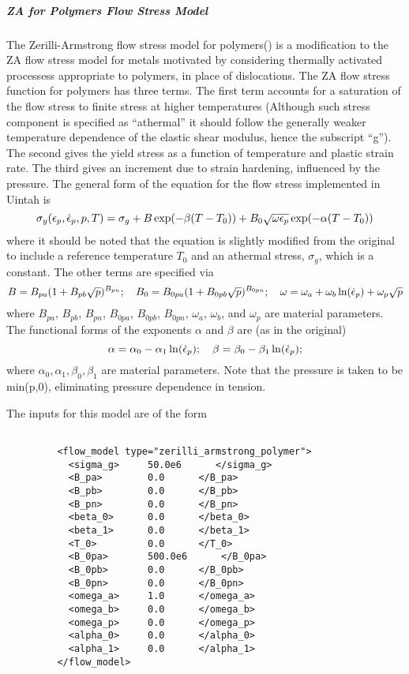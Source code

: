   \subparagraph{ZA for Polymers Flow Stress Model}
  The Zerilli-Armstrong flow stress model for polymers(\cite{Zerilli07})
  is a modification to the ZA flow stress model for metals motivated by considering
  thermally activated processess appropriate to polymers, in place of
  dislocations.  The ZA flow stress function for polymers has three terms.  
  The first term accounts for a saturation of the flow stress to finite stress 
  at higher temperatures (Although such stress component is specified as ``athermal'' 
  it should follow the generally weaker temperature dependence of the elastic 
  shear modulus, hence the subscript ``g''). The second gives the yield stress as 
  a function of temperature and plastic strain rate. The third gives an increment 
  due to strain hardening, influenced by the pressure. The general form of the
  equation for the flow stress implemented in Uintah is
  \begin{equation}
    \sigma_y(\Ep,\Epdot{},p,T) = 
      \sigma_g + B\exp(-\beta(T-T_0)) + 
                           B_0\sqrt{\omega\Ep}\exp(-\alpha(T-T_0))
  \end{equation}
  where it should be noted that the equation is slightly modified from the
  original to include a reference temperature $T_0$ and an athermal stress, 
  $\sigma_g$, which is a constant.  The other terms are specified via
  \begin{equation}
    B=B_{pa}(1+B_{pb}\sqrt{p})^{B_{pn}};\quad
    B_0=B_{0pa}(1+B_{0pb}\sqrt{p})^{B_{0pn}};\quad
    \omega=\omega_a+\omega_b\ln(\Epdot{})+\omega_p \sqrt{p}
  \end{equation}
  where $B_{pa}$, $B_{pb}$, $B_{pn}$, $B_{0pa}$, $B_{0pb}$, $B_{0pn}$, $\omega_a$, $\omega_b$, 
  and $\omega_p$ are material parameters.  The functional forms of the exponents
  $\alpha$ and $\beta$ are (as in the original)
  \begin{equation}
    \alpha = \alpha_0 - \alpha_1 \ln(\Epdot{}); \quad
    \beta = \beta_0 - \beta_1 \ln(\Epdot{}); 
  \end{equation}
  where $\alpha_0, \alpha_1, \beta_0, \beta_1$ are material parameters.  Note that the
  pressure is taken to be min(p,0), eliminating pressure dependence in tension.

  The inputs for this model are of the form
  \begin{Verbatim}[fontsize=\footnotesize]
    
         <flow_model type="zerilli_armstrong_polymer">
           <sigma_g>     50.0e6      </sigma_g>
           <B_pa>        0.0      </B_pa>
           <B_pb>        0.0      </B_pb>
           <B_pn>        0.0      </B_pn>
           <beta_0>      0.0      </beta_0>
           <beta_1>      0.0      </beta_1>
           <T_0>         0.0      </T_0>
           <B_0pa>       500.0e6      </B_0pa>
           <B_0pb>       0.0      </B_0pb>
           <B_0pn>       0.0      </B_0pn>
           <omega_a>     1.0      </omega_a>
           <omega_b>     0.0      </omega_b>
           <omega_p>     0.0      </omega_p>
           <alpha_0>     0.0      </alpha_0>
           <alpha_1>     0.0      </alpha_1>
         </flow_model>

  \end{Verbatim}

